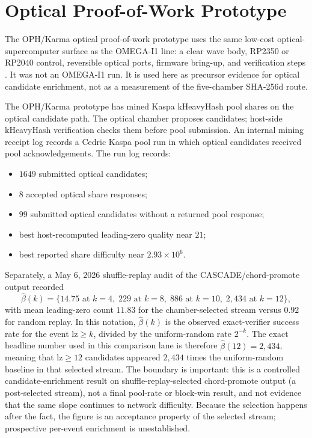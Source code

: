 \documentclass[11pt]{article}
\theoremstyle{definition}
\theoremstyle{remark}
\begin{document}
\FloatBarrier
\section{Optical Proof-of-Work Prototype}

The OPH/Karma optical proof-of-work prototype uses the same low-cost
optical-supercomputer surface as the OMEGA-I1 line: a clear wave body, RP2350 or
RP2040 control, reversible optical ports, firmware bring-up, and verification
steps \cite{OmegaOpticalSupercomputer2026}. It was not an OMEGA-I1 run. It is
used here as precursor evidence for optical candidate enrichment, not as a
measurement of the five-chamber SHA-256d route.

The OPH/Karma prototype has mined Kaspa kHeavyHash pool shares on the optical
candidate path. The optical chamber proposes candidates; host-side kHeavyHash
verification checks them before pool submission. An internal mining receipt log
records a Cedric Kaspa pool run in which optical candidates received pool
acknowledgements. The run log records:

\begin{itemize}
\item \(1649\) submitted optical candidates;
\item \(8\) accepted optical share responses;
\item \(99\) submitted optical candidates without a returned pool response;
\item best host-recomputed leading-zero quality near \(21\);
\item best reported share difficulty near \(2.93\times 10^6\).
\end{itemize}

Separately, a May 6, 2026 shuffle-replay audit of the CASCADE/chord-promote
output recorded
\[
\widehat\beta(k)=
\{14.75\text{ at }k=4,\;229\text{ at }k=8,\;886\text{ at }k=10,\;
2{,}434\text{ at }k=12\},
\]
with mean leading-zero count \(11.83\) for the chamber-selected stream versus
\(0.92\) for random replay. In this notation, \(\widehat\beta(k)\) is the
observed exact-verifier success rate for the event \(\mathrm{lz}\ge k\), divided
by the uniform-random rate \(2^{-k}\). The exact headline number used in this
comparison lane is therefore \(\widehat\beta(12)=2{,}434\), meaning that
\(\mathrm{lz}\ge12\) candidates appeared \(2{,}434\) times the uniform-random
baseline in that selected stream. The boundary is important:
this is a controlled candidate-enrichment result on shuffle-replay-selected
chord-promote output (a post-selected stream), not a final pool-rate or
block-win result, and not evidence that the same slope continues to network
difficulty. Because the selection happens after the fact, the figure is an
acceptance property of the selected stream; prospective per-event enrichment
is unestablished.
\end{document}
